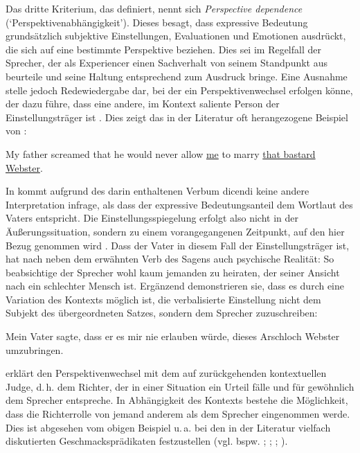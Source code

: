 Das dritte Kriterium, das \citet[173ff.]{Potts.2007a} definiert, nennt sich \textit{Perspective dependence} (`Perspektivenabhängigkeit'). Dieses besagt, dass expressive Bedeutung grundsätzlich subjektive Einstellungen, Evaluationen und Emotionen ausdrückt, die sich auf eine bestimmte Perspektive beziehen. Dies sei im Regelfall der Sprecher, der als Experiencer einen Sachverhalt von seinem Standpunkt aus beurteile und seine Haltung entsprechend zum Ausdruck bringe. Eine Ausnahme stelle jedoch Redewiedergabe dar, bei der ein Perspektivenwechsel erfolgen könne, der dazu führe, dass eine andere, im Kontext saliente Person der Einstellungsträger ist \citep[vgl.][175]{Potts.2007a}. Dies zeigt das in der Literatur oft herangezogene Beispiel von {\citet[6]{Kratzer.1999}}:

\ea  My father screamed that he would never allow \uline{me} to marry \uline{that bastard Webster}. \label{bastard}
\z

In  kommt aufgrund des darin enthaltenen Verbum dicendi keine andere Interpretation infrage, als dass der expressive Bedeutungsanteil dem Wortlaut des Vaters entspricht. Die Einstellungsspiegelung erfolgt also nicht in der Äußerungssituation, sondern zu einem vorangegangenen Zeitpunkt, auf den hier Bezug genommen wird \citep[vgl.][6]{Kratzer.1999}. Dass der Vater in diesem Fall der Einstellungsträger ist, hat nach \citet[11]{dAvis.2019b} neben dem erwähnten Verb des Sagens auch psychische Realität: So beabsichtige der Sprecher wohl kaum jemanden zu heiraten, der seiner Ansicht nach ein schlechter Mensch ist. Ergänzend demonstrieren sie, dass es durch eine Variation des Kontexts möglich ist, die verbalisierte Einstellung nicht dem Subjekt des übergeordneten Satzes, sondern dem Sprecher zuzuschreiben:

\ea  Mein Vater sagte, dass er es mir nie erlauben würde, dieses Arschloch Webster umzubringen.
\z

\citet[173]{Potts.2007a} erklärt den Perspektivenwechsel mit dem auf {\citet[]{Lasersohn.2005}} zurückgehenden kontextuellen \glqq{}Judge\grqq{}, d.\,h. dem Richter, der in einer Situation ein Urteil fälle und für gewöhnlich dem Sprecher entspreche. In Abhängigkeit des Kontexts bestehe die Möglichkeit, dass die Richterrolle von jemand anderem als dem Sprecher eingenommen werde. Dies ist abgesehen vom obigen Beispiel  u.\,a. bei den in der Literatur vielfach diskutierten Geschmacksprädikaten festzustellen (vgl. bspw. {\citealt[]{Lasersohn.2005}}; \citealt[]{Harris.2009}; \citealt[]{Gutzmann.2016a}; {\citealt[]{Kaiser.2017b, Kaiser.2017a}}).

